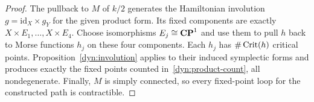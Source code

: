 \begin{proof}
The pullback to $M$ of $k/2$ generates the Hamiltonian involution
$g=\mathrm{id}_X\times g_Y$ for the given product form.  Its fixed
components are exactly $X\times E_1,\ldots,X\times E_4$.  Choose
isomorphisms $E_j\cong\mathbf{CP}^1$ and use them to pull $h$ back to Morse
functions $h_j$ on these four components.  Each $h_j$ has
$\#\operatorname{Crit}(h)$ critical points.  Proposition~\ref{dyn:involution}
applies to their induced symplectic forms and produces exactly
the fixed points counted in~\eqref{dyn:product-count}, all
nondegenerate.  Finally, $M$ is simply connected, so every
fixed-point loop for the constructed path is contractible.
\end{proof}
